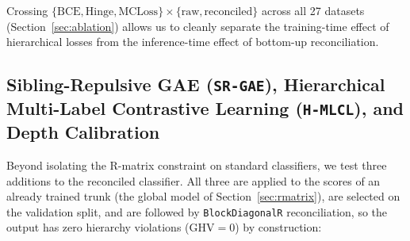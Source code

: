 \documentclass[preprint,12pt]{elsarticle}
\begin{document}
Crossing $\{ \text{BCE}, \text{Hinge}, \text{MCLoss} \} \times \{ \text{raw},
\text{reconciled} \}$ across all 27 datasets (Section~\ref{sec:ablation})
allows us to cleanly separate the training-time effect of hierarchical losses
from the inference-time effect of bottom-up reconciliation.

\subsection{Sibling-Repulsive GAE (\texttt{SR-GAE}), Hierarchical Multi-Label Contrastive Learning (\texttt{H-MLCL}), and Depth Calibration}
\label{sec:method_sr_gae_depth}

Beyond isolating the R-matrix constraint on standard classifiers, we test
three additions to the reconciled classifier. All three are applied to the
scores of an already trained trunk (the global model of
Section~\ref{sec:rmatrix}), are selected on the validation split, and are
followed by \texttt{BlockDiagonalR} reconciliation, so the output has zero
hierarchy violations ($\text{GHV}=0$) by construction:
\end{document}
